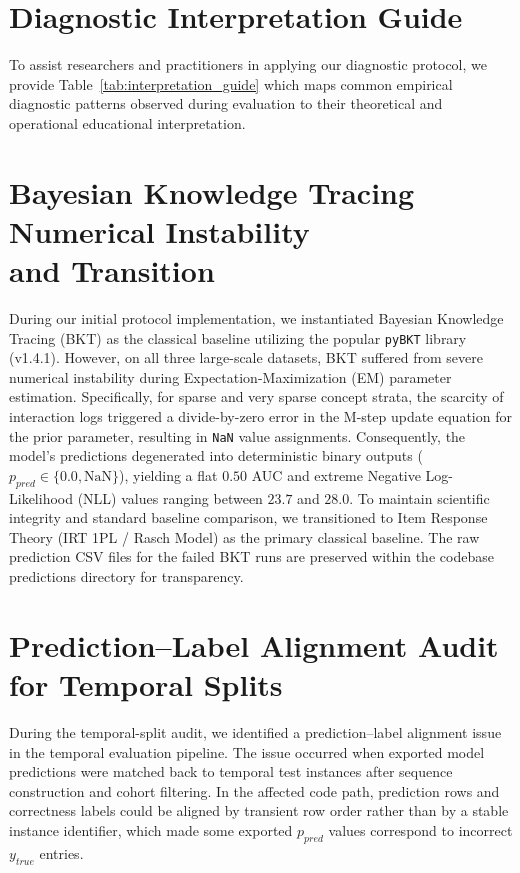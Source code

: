 

\clearpage

\section{Diagnostic Interpretation Guide}
\label{app:interpretation}
To assist researchers and practitioners in applying our diagnostic protocol, we provide Table~\ref{tab:interpretation_guide} which maps common empirical diagnostic patterns observed during evaluation to their theoretical and operational educational interpretation.



\section[Bayesian Knowledge Tracing Numerical Instability and Transition]{Bayesian Knowledge Tracing Numerical Instability \\ and Transition}
\label{app:bkt_instability}
During our initial protocol implementation, we instantiated Bayesian Knowledge Tracing (BKT) as the classical baseline utilizing the popular \texttt{pyBKT} library (v1.4.1). However, on all three large-scale datasets, BKT suffered from severe numerical instability during Expectation-Maximization (EM) parameter estimation. Specifically, for sparse and very sparse concept strata, the scarcity of interaction logs triggered a divide-by-zero error in the M-step update equation for the prior parameter, resulting in \texttt{NaN} value assignments. Consequently, the model's predictions degenerated into deterministic binary outputs ($p_{pred} \in \{0.0, \text{NaN}\}$), yielding a flat $0.50$ AUC and extreme Negative Log-Likelihood (NLL) values ranging between $23.7$ and $28.0$. To maintain scientific integrity and standard baseline comparison, we transitioned to Item Response Theory (IRT 1PL / Rasch Model) as the primary classical baseline. The raw prediction CSV files for the failed BKT runs are preserved within the codebase predictions directory for transparency.

\section{Prediction--Label Alignment Audit for Temporal Splits}
\label{app:alignment}
During the temporal-split audit, we identified a prediction--label alignment issue in the temporal evaluation pipeline. The issue occurred when exported model predictions were matched back to temporal test instances after sequence construction and cohort filtering. In the affected code path, prediction rows and correctness labels could be aligned by transient row order rather than by a stable instance identifier, which made some exported $p_{pred}$ values correspond to incorrect $y_{true}$ entries.

